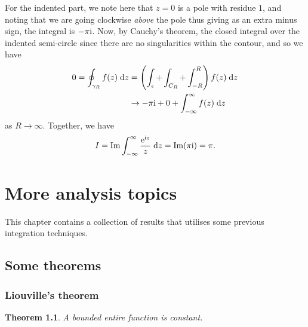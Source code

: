 \documentclass[letter-paper]{tufte-book}
\newtheorem{theorem}{\color{pastel-blue}Theorem}[section]
\newenvironment{example}[1][Example]{\begin{trivlist}
\item[\hskip \labelsep {\bfseries #1}]}{\end{trivlist}}
\newcommand{\ex}{\mathrm{e}}
\newcommand{\zi}{{\rm i}}
\begin{document}
\begin{example}
  For the indented part, we note here that $z=0$ is a pole with residue $1$, and
  noting that we are going clockwise \emph{above} the pole thus giving as an
  extra minus sign, the integral is $-\pi \zi$. Now, by Cauchy's theorem, the
  closed integral over the indented semi-circle since there are no singularities
  within the contour, and so we have
  \begin{align*}
    0 = \oint_{\gamma_R} f(z)\; \mathrm{d}z &= \left(\int_\epsilon + \int_{C_R} + \int^R_{-R}\right)f(z)\; \mathrm{d}z \\
      & \to -\pi \zi + 0 + \int^\infty_{-\infty} f(z)\; \mathrm{d}z
  \end{align*}
  as $R\to\infty$. Together, we have
  \begin{equation*}
    I = \mbox{Im} \int_{-\infty}^\infty \frac{\ex^{\zi z}}{z}\; \mathrm{d}z = \mbox{Im} (\pi \zi) = \pi.
  \end{equation*}
\end{example}


\chapter{More analysis topics}

This chapter contains a collection of results that utilises some previous
integration techniques.


\section{Some theorems}


\subsection{Liouville's theorem}

\begin{theorem}
  A bounded entire function is constant.
\end{theorem}
\end{document}
